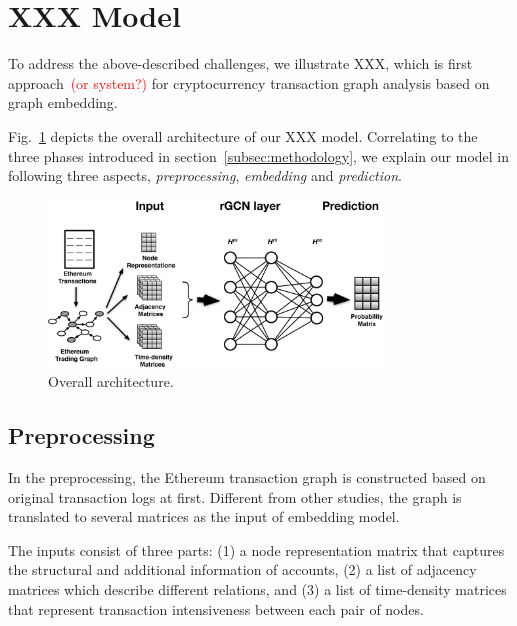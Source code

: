 
\section{XXX Model}
\label{sec:model}
To address the above-described challenges, we illustrate XXX, which is first approach~\textcolor{red}{(or system?)} for cryptocurrency transaction graph analysis based on graph embedding.

Fig.~\ref{fig:architecture} depicts the overall architecture of our XXX model. Correlating to the three phases introduced in section~\ref{subsec:methodology}, we explain our model in following three aspects, \emph{preprocessing}, \emph{embedding} and \emph{prediction}.

\begin{figure}[htbp]
	\centering
	\includegraphics[width=3.5in]{fig/architecture.eps}
	\caption{Overall architecture.}
	\label{fig:architecture}
\end{figure}


\subsection{Preprocessing}
\label{sec:input}
In the preprocessing, the Ethereum transaction graph is constructed based on original transaction logs at first. Different from other studies, the graph is translated to several matrices as the input of embedding model.

 The inputs consist of three parts: (1) a node representation matrix that captures the structural and additional information of accounts, (2) a list of adjacency matrices which describe different relations, and (3) a list of time-density matrices that represent transaction intensiveness between each pair of nodes.

